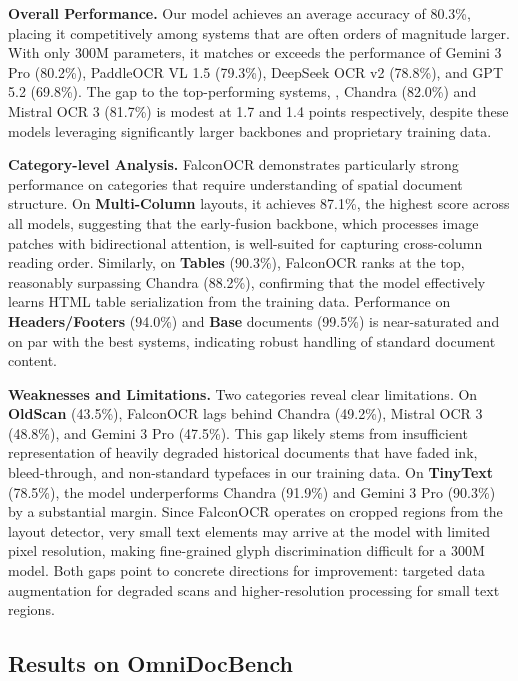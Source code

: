 \noindent \textbf{Overall Performance.} Our model achieves an average accuracy of {80.3\%}, placing it competitively among systems that are often orders of magnitude larger. With only 300M parameters, it matches or exceeds the performance of Gemini 3 Pro (80.2\%), PaddleOCR VL 1.5 (79.3\%), DeepSeek OCR v2 (78.8\%), and GPT 5.2 (69.8\%). The gap to the top-performing systems, \ie, Chandra (82.0\%) and Mistral OCR 3 (81.7\%) is modest at 1.7 and 1.4 points respectively, despite these models leveraging significantly larger backbones and proprietary training data.

\noindent \textbf{Category-level Analysis.} FalconOCR demonstrates particularly strong performance on categories that require understanding of spatial document structure. On \textbf{Multi-Column} layouts, it achieves {87.1\%}, the highest score across all models, suggesting that the early-fusion backbone, which processes image patches with bidirectional attention, is well-suited for capturing cross-column reading order. Similarly, on \textbf{Tables} (90.3\%), FalconOCR ranks at the top, reasonably surpassing Chandra (88.2\%), confirming that the model effectively learns HTML table serialization from the training data. Performance on \textbf{Headers/Footers} ({94.0\%}) and \textbf{Base} documents ({99.5\%}) is near-saturated and on par with the best systems, indicating robust handling of standard document content.

\noindent \textbf{Weaknesses and Limitations.} Two categories reveal clear limitations. On \textbf{OldScan} (43.5\%), FalconOCR lags behind Chandra (49.2\%), Mistral OCR 3 (48.8\%), and Gemini 3 Pro (47.5\%). This gap likely stems from insufficient representation of heavily degraded historical documents that have faded ink, bleed-through, and non-standard typefaces in our training data. On \textbf{TinyText} (78.5\%), the model underperforms Chandra (91.9\%) and Gemini 3 Pro (90.3\%) by a substantial margin. Since FalconOCR operates on cropped regions from the layout detector, very small text elements may arrive at the model with limited pixel resolution, making fine-grained glyph discrimination difficult for a 300M model. Both gaps point to concrete directions for improvement: targeted data augmentation for degraded scans and higher-resolution processing for small text regions.



\subsection{Results on OmniDocBench}

